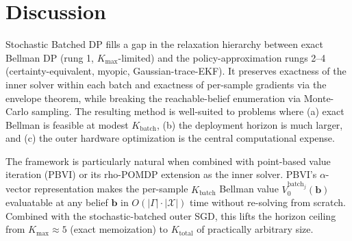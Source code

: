 \documentclass[11pt,a4paper]{article}
\newcommand{\bb}{\bm{b}}
\begin{document}
\section{Discussion}
\label{sec:discussion}

Stochastic Batched DP fills a gap in the relaxation hierarchy between exact Bellman DP
(rung 1, $K_\mathrm{max}$-limited) and the policy-approximation rungs 2--4
(certainty-equivalent, myopic, Gaussian-trace-EKF).  It preserves exactness of the inner
solver within each batch and exactness of per-sample gradients via the envelope theorem,
while breaking the reachable-belief enumeration via Monte-Carlo sampling.  The resulting
method is well-suited to problems where (a) exact Bellman is feasible at modest
$K_\mathrm{batch}$, (b) the deployment horizon is much larger, and (c) the outer hardware
optimization is the central computational expense.

The framework is particularly natural when combined with point-based value iteration
(PBVI) or its rho-POMDP extension as the inner solver.  PBVI's $\alpha$-vector
representation makes the per-sample $K_\mathrm{batch}$ Bellman value $V_0^{\mathrm{batch}_j}(\bb)$
evaluatable at any belief $\bb$ in $O(|\Gamma| \cdot |\mathcal{X}|)$ time without
re-solving from scratch.  Combined with the stochastic-batched outer SGD, this lifts the
horizon ceiling from $K_\mathrm{max} \approx 5$ (exact memoization) to $K_\mathrm{total}$
of practically arbitrary size.
\end{document}
